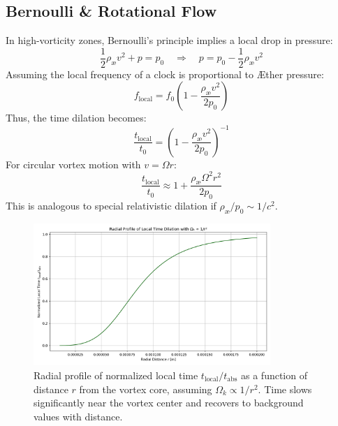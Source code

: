 \subsection{Bernoulli \& Rotational Flow}
In high-vorticity zones, Bernoulli's principle implies a local drop in pressure:
\begin{equation}
    \frac{1}{2} \rho_\text{æ} v^2 + p = p_0 \quad \Rightarrow \quad p = p_0 - \frac{1}{2} \rho_\text{æ} v^2
\end{equation}
Assuming the local frequency of a clock is proportional to Æther pressure:
\begin{equation}
    f_{\text{local}} = f_0 \left(1 - \frac{\rho_\text{æ} v^2}{2p_0} \right)
\end{equation}
Thus, the time dilation becomes:
\begin{equation}
    \frac{t_{\text{local}}}{t_0} = \left(1 - \frac{\rho_\text{æ} v^2}{2p_0} \right)^{-1}
\end{equation}
For circular vortex motion with $v = \Omega r$:
\begin{equation}
    \frac{t_{\text{local}}}{t_0} \approx 1 + \frac{\rho_\text{æ} \Omega^2 r^2}{2p_0}
\end{equation}
This is analogous to special relativistic dilation if $\rho_\text{æ}/p_0 \sim 1/c^2$.

\begin{figure}[h!]
    \centering
    \includegraphics[width=0.8\textwidth]{export/RadialProfileOfLocalTimeDilation_Radial_LocalTime_Dilation}
    \caption{Radial profile of normalized local time $t_{\text{local}} / t_{\text{abs}}$ as a function of distance $r$ from the vortex core, assuming $\Omega_k \propto 1/r^2$. Time slows significantly near the vortex center and recovers to background values with distance.}
    \label{fig:radial_time_profile}
\end{figure}

